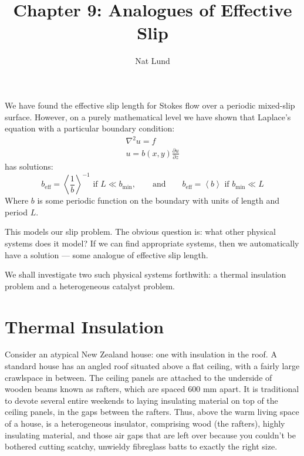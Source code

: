 \documentclass[a4paper]{report}
\title{Chapter 9: Analogues of Effective Slip}
\author{Nat Lund}
\newcommand{\beff}{\ensuremath{b_{\mathrm{eff}}}}
\newcommand{\bmin}{\ensuremath{b_{\mathrm{min}}}}
\begin{document}
\maketitle

We have found the effective slip length for Stokes flow over a periodic mixed-slip surface.  However, on a purely mathematical level we have shown that Laplace's equation with a particular boundary condition:
\begin{gather}
\nabla^2 u = f \\
u = b(x,y) \frac{\partial u}{\partial z}
\end{gather}
has solutions:
\begin{equation}
\beff = \left< \frac{1}{b} \right>^{-1} \text{   if   } L \ll \bmin, \qquad \text{and} \qquad
\beff = \left< b \right> \text{   if   } \bmin \ll L
\end{equation}
Where $b$ is some periodic function on the boundary with units of length and period $L$.

\vspace{1em}
This models our slip problem.  The obvious question is: what other physical systems does it model?  If we can find appropriate systems, then we automatically have a solution --- some analogue of effective slip length.

We shall investigate two such physical systems forthwith: a thermal insulation problem and a heterogeneous catalyst problem.


\section*{Thermal Insulation}

Consider an atypical New Zealand house: one with insulation in the roof.  A standard house has an angled roof situated above a flat ceiling, with a fairly large crawlspace in between.  The ceiling panels are attached to the underside of wooden beams known as rafters, which are spaced 600 mm apart.  It is traditional to devote several entire weekends to laying insulating material on top of the ceiling panels, in the gaps between the rafters.
Thus, above the warm living space of a house, is a heterogeneous insulator, comprising wood (the rafters), highly insulating material, and those air gaps that are left over because you couldn't be bothered cutting scatchy, unwieldy fibreglass batts to exactly the right size.
\end{document}
